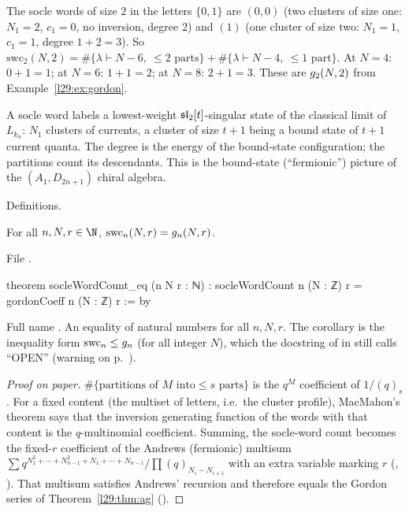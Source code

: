 \begin{example}[$n=2$, $r=2$]\label{l29:ex:socle}
The socle words of size $2$ in the letters $\{0,1\}$ are $(0,0)$ (two clusters of size one: $N_1=2$, $c_1=0$, no
inversion, degree $2$) and $(1)$ (one cluster of size two: $N_1=1$, $c_1=1$, degree $1+2=3$). So
$\mathrm{swc}_2(N,2)=\#\{\lambda\vdash N-6,\ \le2\text{ parts}\}+\#\{\lambda\vdash N-4,\ \le1\text{ part}\}$. At $N=4$:
$0+1=1$; at $N=6$: $1+1=2$; at $N=8$: $2+1=3$. These are $g_2(N,2)$ from Example~\ref{l29:ex:gordon}.
\end{example}

\begin{physics}
A socle word labels a lowest-weight $\mathfrak{sl}_2[t]$-singular state of the classical limit of $L_{k_n}$: $N_1$
clusters of currents, a cluster of size $t+1$ being a bound state of $t+1$ current quanta. The degree is the energy of
the bound-state configuration; the partitions count its descendants. This is the bound-state (``fermionic'') picture of
the $(A_1,D_{2n+1})$ chiral algebra.
\end{physics}

\begin{status}
Definitions.
\end{status}

\begin{theorem}\label{l29:thm:swc}
For all $n,N,r\in\N$, $\mathrm{swc}_n(N,r)=g_n(N,r)$.
\end{theorem}

\noindent File .
\begin{leancode}
theorem socleWordCount_eq (n N r : ℕ) :
    socleWordCount n (N : ℤ) r = gordonCoeff n (N : ℤ) r := by
\end{leancode}

\begin{dictionary}
Full name . An equality of natural numbers for all $n,N,r$. The corollary
 is the inequality form $\mathrm{swc}_n\le g_n$ (for all integer $N$), which the
docstring of  in  still calls ``OPEN''
(warning on p.~\pageref{l29:warn:stale}).
\end{dictionary}

\begin{proof}[Proof on paper]
$\#\{\text{partitions of }M\text{ into}\le s\text{ parts}\}$ is the $q^M$ coefficient of $1/(q)_s$. For a fixed
content (the multiset of letters, i.e.\ the cluster profile), MacMahon's theorem says that the inversion generating
function of the words with that content is the $q$-multinomial coefficient. Summing, the socle-word count becomes the
fixed-$r$ coefficient of the Andrews (fermionic) multisum
$\sum q^{N_1^2+\cdots+N_{n-1}^2+N_1+\cdots+N_{n-1}}/\prod(q)_{N_i-N_{i+1}}$ with an extra variable marking $r$
(, ). That multisum satisfies Andrews' recursion and therefore equals the
Gordon series of Theorem~\ref{l29:thm:ag} ().
\end{proof}

